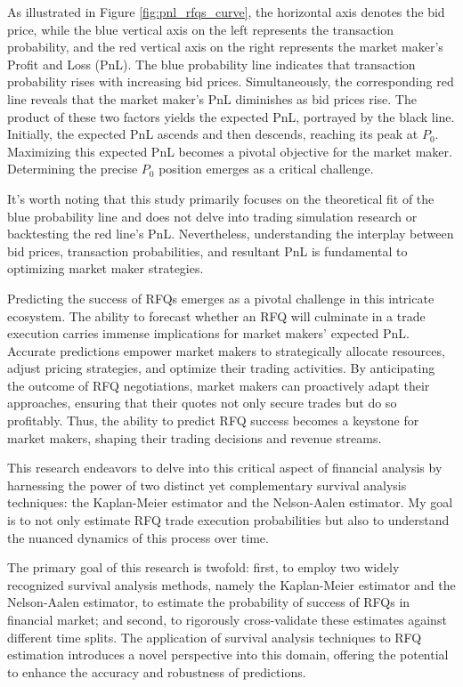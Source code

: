 As illustrated in Figure \ref{fig:pnl_rfqs_curve}, the horizontal axis denotes the bid price, while the blue vertical axis on the left represents the transaction probability, and the red vertical axis on the right represents the market maker's Profit and Loss (PnL). The blue probability line indicates that transaction probability rises with increasing bid prices. Simultaneously, the corresponding red line reveals that the market maker's PnL diminishes as bid prices rise. The product of these two factors yields the expected PnL, portrayed by the black line. Initially, the expected PnL ascends and then descends, reaching its peak at $P_0$. Maximizing this expected PnL becomes a pivotal objective for the market maker. Determining the precise $P_0$ position emerges as a critical challenge.

It's worth noting that this study primarily focuses on the theoretical fit of the blue probability line and does not delve into trading simulation research or backtesting the red line's PnL. Nevertheless, understanding the interplay between bid prices, transaction probabilities, and resultant PnL is fundamental to optimizing market maker strategies.

Predicting the success of RFQs emerges as a pivotal challenge in this intricate ecosystem. The ability to forecast whether an RFQ will culminate in a trade execution carries immense implications for market makers' expected PnL. Accurate predictions empower market makers to strategically allocate resources, adjust pricing strategies, and optimize their trading activities. By anticipating the outcome of RFQ negotiations, market makers can proactively adapt their approaches, ensuring that their quotes not only secure trades but do so profitably. Thus, the ability to predict RFQ success becomes a keystone for market makers, shaping their trading decisions and revenue streams.

This research endeavors to delve into this critical aspect of financial analysis by harnessing the power of two distinct yet complementary survival analysis techniques: the Kaplan-Meier estimator and the Nelson-Aalen estimator. My goal is to not only estimate RFQ trade execution probabilities but also to understand the nuanced dynamics of this process over time.

The primary goal of this research is twofold: first, to employ two widely recognized survival analysis methods, namely the Kaplan-Meier estimator and the Nelson-Aalen estimator, to estimate the probability of success of RFQs in financial market; and second, to rigorously cross-validate these estimates against different time splits. The application of survival analysis techniques to RFQ estimation introduces a novel perspective into this domain, offering the potential to enhance the accuracy and robustness of predictions.

